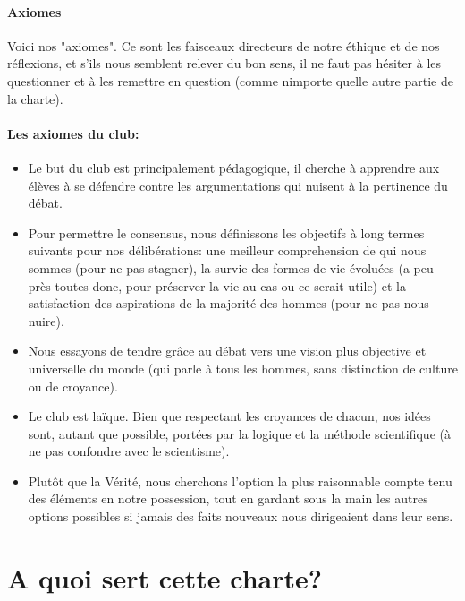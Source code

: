 \documentclass[a4paper,11pt]{article}
\begin{document}
\paragraph{Axiomes}
Voici nos "axiomes". Ce sont les faisceaux directeurs de notre éthique et de nos réflexions, et s'ils nous semblent relever du bon sens, il ne faut pas hésiter à les questionner et à les remettre en question (comme nimporte quelle autre partie de la charte). 

\paragraph{Les axiomes du club:}
\begin{itemize}
 \item  Le but du club est principalement pédagogique, il cherche à apprendre aux élèves à se défendre contre les argumentations qui nuisent à la pertinence du débat.
 \item  Pour permettre le consensus, nous définissons les objectifs à long termes suivants pour nos délibérations: une meilleur comprehension de qui nous sommes (pour ne pas stagner), la survie des formes de vie évoluées (a peu près toutes donc, pour préserver la vie au cas ou ce serait utile) et la satisfaction des aspirations de la majorité des hommes (pour ne pas nous nuire).
 \item  Nous essayons de tendre grâce au débat vers une vision plus objective et universelle du monde (qui parle à tous les hommes, sans distinction de culture ou de croyance).
 \item  Le club est laïque. Bien que respectant les croyances de chacun, nos idées sont, autant que possible, portées par la logique et la méthode scientifique (à ne pas confondre avec le scientisme).
 \item  Plutôt que la Vérité, nous cherchons l'option la plus raisonnable compte tenu des éléments en notre possession, tout en gardant sous la main les autres options possibles si jamais des faits nouveaux nous dirigeaient dans leur sens.
\end{itemize}

\section{A quoi sert cette charte?}
\end{document}
